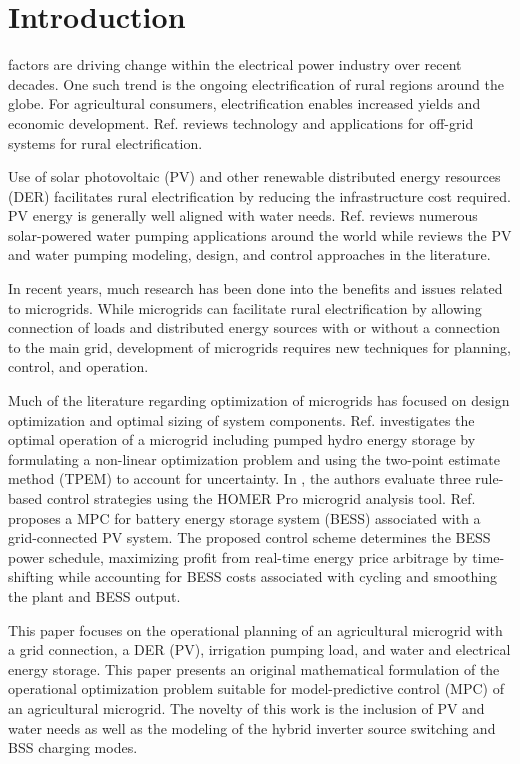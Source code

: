 \section{Introduction}
\label{sec:intro}

 factors are driving change within the electrical power industry over recent decades.
One such trend is the ongoing electrification of rural regions around the globe.
For agricultural consumers, electrification enables increased yields and economic development.
Ref. \cite{Mandelli2016} reviews technology and applications for off-grid systems for rural electrification.

Use of solar photovoltaic (PV) and other renewable distributed energy resources (DER) facilitates rural electrification by reducing the infrastructure cost required.
PV energy is generally well aligned with water needs\cite{Aliyu2018}.
Ref. \cite{Aliyu2018} reviews numerous solar-powered water pumping applications around the world while \cite{Muhsen2017} reviews the PV and water pumping modeling, design, and control approaches in the literature.

In recent years, much research has been done into the benefits and issues related to microgrids\cite{Chandak2021,Choudhury2020}.
While microgrids can facilitate rural electrification by allowing connection of loads and distributed energy sources with or without a connection to the main grid,
development of microgrids requires new techniques for planning, control, and operation\cite{Bhuiyan2014,Reca-Cardena2018}.

Much of the literature regarding optimization of microgrids has focused on design optimization and optimal sizing of system components\cite{Bhuiyan2014,Dawoud2018}.
Ref. \cite{Ghasemi2018} investigates the optimal operation of a microgrid including pumped hydro energy storage by formulating a non-linear optimization problem and using the two-point estimate method (TPEM) to account for uncertainty. 
In \cite{Shoeb2018}, the authors evaluate three rule-based control strategies using the HOMER Pro microgrid analysis tool.
Ref. \cite{Wang2014} proposes a MPC for battery energy storage system (BESS) associated with a grid-connected PV system. The proposed control scheme determines the BESS power schedule, maximizing profit from real-time energy price arbitrage by time-shifting while accounting for BESS costs associated with cycling and smoothing the plant and BESS output.

This paper focuses on the operational planning of an agricultural microgrid with a grid connection, a DER (PV), irrigation pumping load, and water and electrical energy storage.
This paper presents an original mathematical formulation of the operational optimization problem suitable for model-predictive control (MPC) of an agricultural microgrid.
The novelty of this work is the inclusion of PV and water needs as well as the modeling of the hybrid inverter source switching and BSS charging modes.

